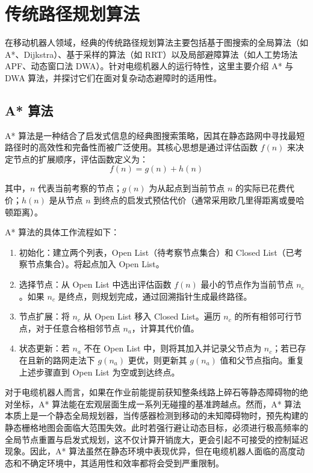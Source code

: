 \documentclass[
  oneside,
  degree=bachelor,
  fullwidthstop=false,
  fontset=fandol,
  times=false,
  minted=true,
  biblatex=true,
]{tongjithesis}
\begin{document}
\section{传统路径规划算法}
在移动机器人领域，经典的传统路径规划算法主要包括基于图搜索的全局算法（如 A*、Dijkstra）、基于采样的算法（如 RRT）以及局部避障算法（如人工势场法 APF、动态窗口法 DWA）。针对电缆机器人的运行特性，这里主要介绍 A* 与 DWA 算法，并探讨它们在面对复杂动态避障时的适用性。

\subsection{A* 算法}
A* 算法是一种结合了启发式信息的经典图搜索策略，因其在静态路网中寻找最短路径时的高效性和完备性而被广泛使用。其核心思想是通过评估函数 $f(n)$ 来决定节点的扩展顺序，评估函数定义为：
\begin{equation}
    f(n) = g(n) + h(n)
\end{equation}

其中，$n$ 代表当前考察的节点；$g(n)$ 为从起点到当前节点 $n$ 的实际已花费代价；$h(n)$ 是从节点 $n$ 到终点的启发式预估代价（通常采用欧几里得距离或曼哈顿距离）。

A* 算法的具体工作流程如下：
\begin{enumerate}
    \item 初始化：建立两个列表，Open List（待考察节点集合）和 Closed List（已考察节点集合）。将起点加入 Open List。
    \item 选择节点：从 Open List 中选出评估函数 $f(n)$ 最小的节点作为当前节点 $n_c$。如果 $n_c$ 是终点，则规划完成，通过回溯指针生成最终路径。
    \item 节点扩展：将 $n_c$ 从 Open List 移入 Closed List。遍历 $n_c$ 的所有相邻可行节点，对于任意合格相邻节点 $n_a$，计算其代价值。
    \item 状态更新：若 $n_a$ 不在 Open List 中，则将其加入并记录父节点为 $n_c$；若已存在且新的路网走法下 $g(n_a)$ 更优，则更新其 $g(n_a)$ 值和父节点指向。重复上述步骤直到 Open List 为空或到达终点。
\end{enumerate}

对于电缆机器人而言，如果在作业前能提前获知整条线路上碎石等静态障碍物的绝对坐标，A* 算法能在宏观层面生成一系列无碰撞的基准跨越点。然而，A* 算法本质上是一个静态全局规划器，当传感器检测到移动的未知障碍物时，预先构建的静态栅格地图会面临大范围失效。此时若强行避让动态目标，必须进行极高频率的全局节点重置与启发式规划，这不仅计算开销庞大，更会引起不可接受的控制延迟现象。因此，A* 算法虽然在静态环境中表现优异，但在电缆机器人面临的高度动态和不确定环境中，其适用性和效率都将会受到严重限制。
\end{document}

